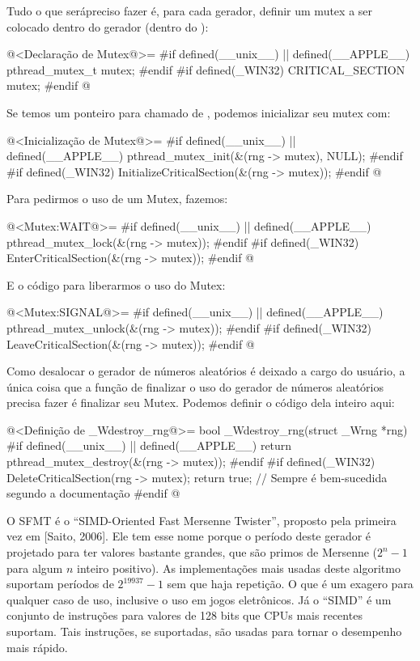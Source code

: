Tudo o que serápreciso fazer é, para cada gerador, definir um mutex a
ser colocado dentro do gerador (dentro do ):

\iniciocodigo
@<Declaração de Mutex@>=
#if defined(__unix__) || defined(__APPLE__)
pthread_mutex_t mutex;
#endif
#if defined(_WIN32)
CRITICAL_SECTION mutex;
#endif
@
\fimcodigo

Se temos um ponteiro para  chamado
de , podemos inicializar seu mutex com:

\iniciocodigo
@<Inicialização de Mutex@>=
#if defined(__unix__) || defined(__APPLE__)
pthread_mutex_init(&(rng -> mutex), NULL);
#endif
#if defined(_WIN32)
InitializeCriticalSection(&(rng -> mutex));
#endif
@
\fimcodigo

Para pedirmos o uso de um Mutex, fazemos:

\iniciocodigo
@<Mutex:WAIT@>=
#if defined(__unix__) || defined(__APPLE__)
pthread_mutex_lock(&(rng -> mutex));
#endif
#if defined(_WIN32)
EnterCriticalSection(&(rng -> mutex));
#endif
@
\fimcodigo

E o código para liberarmos o uso do Mutex:

\iniciocodigo
@<Mutex:SIGNAL@>=
#if defined(__unix__) || defined(__APPLE__)
pthread_mutex_unlock(&(rng -> mutex));
#endif
#if defined(_WIN32)
LeaveCriticalSection(&(rng -> mutex));
#endif
@
\fimcodigo

Como desalocar o gerador de números aleatórios é deixado a cargo do
usuário, a única coisa que a função de finalizar o uso do gerador de
números aleatórios precisa fazer é finalizar seu Mutex. Podemos
definir o código dela inteiro aqui:

\iniciocodigo
@<Definição de \_Wdestroy\_rng@>=
bool _Wdestroy_rng(struct _Wrng *rng){
#if defined(__unix__) || defined(__APPLE__)
  return pthread_mutex_destroy(&(rng -> mutex));
#endif
#if defined(_WIN32)
  DeleteCriticalSection(rng -> mutex);
  return true; // Sempre é bem-sucedida segundo a documentação
#endif
}
@
\fimcodigo



O SFMT é o ``SIMD-Oriented Fast Mersenne Twister'', proposto pela
primeira vez em [Saito, 2006]. Ele tem esse nome porque o período
deste gerador é projetado para ter valores bastante grandes, que são
primos de Mersenne ($2^n-1$ para algum $n$ inteiro positivo). As
implementações mais usadas deste algoritmo suportam períodos de
$2^{19937}-1$ sem que haja repetição. O que é um exagero para qualquer
caso de uso, inclusive o uso em jogos eletrônicos. Já o ``SIMD'' é um
conjunto de instruções para valores de 128 bits que CPUs mais recentes
suportam. Tais instruções, se suportadas, são usadas para tornar o
desempenho mais rápido.

